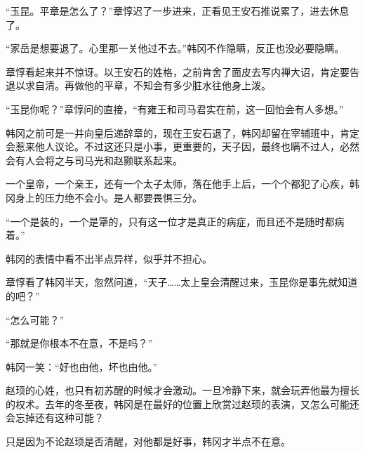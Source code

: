 “玉昆。平章是怎么了？”章惇迟了一步进来，正看见王安石推说累了，进去休息了。

“家岳是想要退了。心里那一关他过不去。”韩冈不作隐瞒，反正也没必要隐瞒。

章惇看起来并不惊讶。以王安石的姓格，之前肯舍了面皮去写内禅大诏，肯定要告退以求自清。再做他的平章，不知会有多少脏水往他身上泼。

“玉昆你呢？”章惇问的直接，“有雍王和司马君实在前，这一回怕会有人多想。”

韩冈之前可是一并向皇后递辞章的，现在王安石退了，韩冈却留在宰辅班中，肯定会惹来他人议论。不过这还只是小事，更重要的，天子因，最终也瞒不过人，必然会有人会将之与司马光和赵颢联系起来。

一个皇帝，一个亲王，还有一个太子太师，落在他手上后，一个个都犯了心疾，韩冈身上的压力绝不会小。是人都要畏惧三分。

“一个是装的，一个是犟的，只有这一位才是真正的病症，而且还不是随时都病着。”

韩冈的表情中看不出半点异样，似乎并不担心。

章惇看了韩冈半天，忽然问道，“天子……太上皇会清醒过来，玉昆你是事先就知道的吧？”

“怎么可能？”

“那就是你根本不在意，不是吗？”

韩冈一笑：“好也由他，坏也由他。”

赵顼的心姓，也只有初苏醒的时候才会激动。一旦冷静下来，就会玩弄他最为擅长的权术。去年的冬至夜，韩冈是在最好的位置上欣赏过赵顼的表演，又怎么可能还会忘掉还有这种可能？

只是因为不论赵顼是否清醒，对他都是好事，韩冈才半点不在意。


